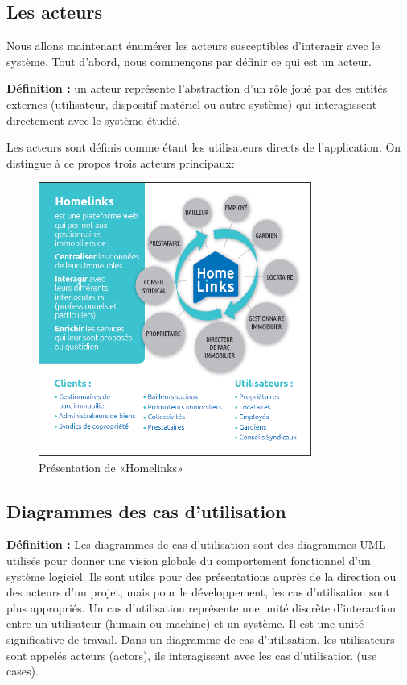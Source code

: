 \documentclass[a4paper,10pt]{book}
\begin{document}
 \subsection{Les acteurs } 
\par Nous allons maintenant énumérer les acteurs susceptibles d'interagir avec le système. Tout d'abord, nous commençons par définir ce qui est un acteur. 
\par \textbf{Définition :} un acteur représente l'abstraction d'un rôle joué par des entités externes (utilisateur, dispositif matériel ou autre système) qui interagissent directement avec le système étudié. 
\par  
   Les acteurs sont définis comme étant les utilisateurs directs de l’application. On distingue à ce propos trois acteurs principaux: 
\vspace{3cm}
\begin{figure}[!h]
\centering 
\includegraphics[width=0.8\textwidth]{acteurs.png}
\caption{Présentation de «Homelinks» \cite{hl}}
\end{figure}
\vspace{3cm}

\subsection{Diagrammes des cas d'utilisation }
\par\textbf{Définition :} Les diagrammes de cas d'utilisation sont des diagrammes UML utilisés pour donner une vision globale du comportement fonctionnel d'un système logiciel. Ils sont utiles pour des présentations auprès de la direction ou des acteurs d'un projet, mais pour le développement, les cas d'utilisation sont plus appropriés. Un cas d'utilisation représente une unité discrète d'interaction entre un utilisateur (humain ou machine) et un système. Il est une unité significative de travail. Dans un diagramme de cas d'utilisation, les utilisateurs sont appelés acteurs (actors), ils interagissent avec les cas d'utilisation (use cases). 
\end{document}
